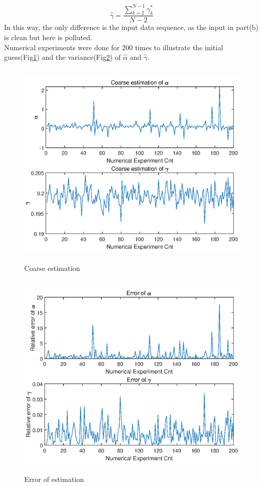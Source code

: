 \documentclass[paper=a4, fontsize=11pt]{scrartcl} %
\numberwithin{equation}{section} %
\numberwithin{figure}{section} %
\numberwithin{table}{section} %
\begin{document}
\begin{enumerate}[(a)]
\begin{equation}
				\hat{\gamma} = \frac{\sum_{k=2}^{N-1}\gamma_k^*}{N-2}
			\end{equation}
			In this way, the only difference is the input data sequence, as the input in part(b) is clean but here is polluted. \\
			Numerical experiments were done for 200 times to illustrate the initial guess(Fig\ref{coarse_ag}) and the variance(Fig\ref{err_ag}) of $\hat{\alpha}$ and $\hat{\gamma}$.
			\begin{figure}[!htbp]\centering
				\includegraphics[height=10cm]{../pic/coarse_estimation.eps}
				\caption{Coarse estimation} 
				\label{coarse_ag}
			\end{figure}
			\begin{figure}[!htbp]\centering
				\includegraphics[height=10cm]{../pic/coarse_estimation_err.eps}
				\caption{Error of estimation}
				\label{err_ag}
			\end{figure}
		

\end{enumerate}
\end{document}
